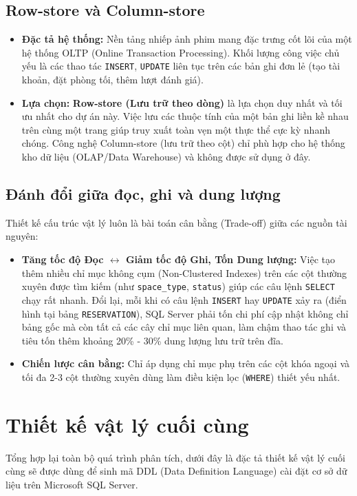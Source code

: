 \subsection{Row-store và Column-store}
\begin{itemize}
    \item \textbf{Đặc tả hệ thống:} Nền tảng nhiếp ảnh phim mang đặc trưng cốt lõi của một hệ thống OLTP (Online Transaction Processing). Khối lượng công việc chủ yếu là các thao tác \texttt{INSERT}, \texttt{UPDATE} liên tục trên các bản ghi đơn lẻ (tạo tài khoản, đặt phòng tối, thêm lượt đánh giá).
    \item \textbf{Lựa chọn:} \textbf{Row-store (Lưu trữ theo dòng)} là lựa chọn duy nhất và tối ưu nhất cho dự án này. Việc lưu các thuộc tính của một bản ghi liền kề nhau trên cùng một trang giúp truy xuất toàn vẹn một thực thể cực kỳ nhanh chóng. Công nghệ Column-store (lưu trữ theo cột) chỉ phù hợp cho hệ thống kho dữ liệu (OLAP/Data Warehouse) và không được sử dụng ở đây.
\end{itemize}

\subsection{Đánh đổi giữa đọc, ghi và dung lượng}
Thiết kế cấu trúc vật lý luôn là bài toán cân bằng (Trade-off) giữa các nguồn tài nguyên:
\begin{itemize}
    \item \textbf{Tăng tốc độ Đọc $\leftrightarrow$ Giảm tốc độ Ghi, Tốn Dung lượng:} Việc tạo thêm nhiều chỉ mục không cụm (Non-Clustered Indexes) trên các cột thường xuyên được tìm kiếm (như \texttt{space\_type}, \texttt{status}) giúp các câu lệnh \texttt{SELECT} chạy rất nhanh. Đổi lại, mỗi khi có câu lệnh \texttt{INSERT} hay \texttt{UPDATE} xảy ra (điển hình tại bảng \texttt{RESERVATION}), SQL Server phải tốn chi phí cập nhật không chỉ bảng gốc mà còn tất cả các cây chỉ mục liên quan, làm chậm thao tác ghi và tiêu tốn thêm khoảng 20\% - 30\% dung lượng lưu trữ trên đĩa.
    \item \textbf{Chiến lược cân bằng:} Chỉ áp dụng chỉ mục phụ trên các cột khóa ngoại và tối đa 2-3 cột thường xuyên dùng làm điều kiện lọc (\texttt{WHERE}) thiết yếu nhất.
\end{itemize}

\section{Thiết kế vật lý cuối cùng}
Tổng hợp lại toàn bộ quá trình phân tích, dưới đây là đặc tả thiết kế vật lý cuối cùng sẽ được dùng để sinh mã DDL (Data Definition Language) cài đặt cơ sở dữ liệu trên Microsoft SQL Server.

